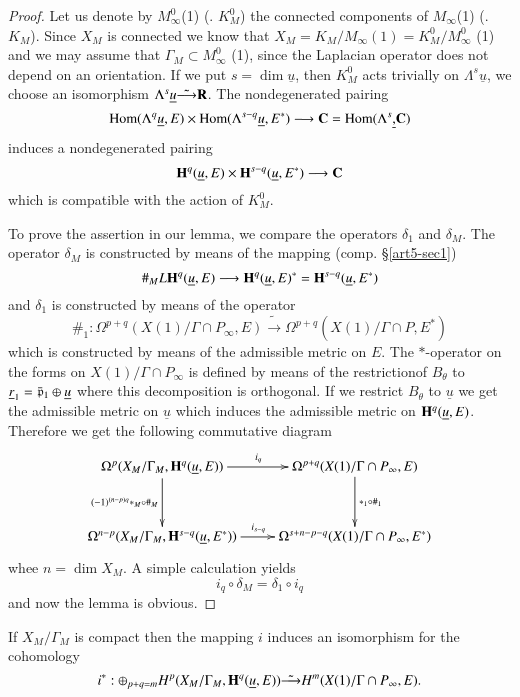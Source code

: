\begin{proof}
Let us denote by $M^0_\infty$(1) (\resp. $K^0_M$) the connected components of $M_\infty$(1) (\resp. $K_M$). Since $X_M$ is connected we know that $X_M = K_M / M_\infty (1) = K^0_M / M^0_\infty$ (1) and we may assume that $\Gamma_M \subset M^0_\infty$ (1), since the Laplacian operator does not depend on an orientation. If we put $s = \dim \underline{u}$, then $K^0_M$ acts trivially on $\Lambda^s \underline{u}$, we choose an isomorphism $\Lambda^s \underline{u} \tilde{\longrightarrow} \mathbf{R}$. The nondegenerated pairing
$$
\operatorname{Hom} (\Lambda^q \underline{u}, E) \times \operatorname{Hom} (\Lambda^{s-q} \underline{u}, E^\ast) \longrightarrow \mathbf{C} = \operatorname{Hom} (\Lambda^s \underline, \mathbf{C})
$$
induces a nondegenerated pairing 
$$
\mathbf{H}^q (\underline{u}, E) \times \mathbf{H}^{s-q}(\underline{u}, E^\ast) \longrightarrow \mathbf{C}
$$
which is compatible with the action of $K^0_M$.

To prove the assertion in our lemma, we compare the operators $\delta_1$ and $\delta_M$. The operator $\delta_M$ is constructed by means of the mapping (comp. \S \ref{art5-sec1})
$$
\#_M L \mathbf{H}^q (\underline{u}, E) \longrightarrow \mathbf{H}^q (\underline{u}, E)^\ast = \mathbf{H}^{s-q} (\underline{u}, E^\ast)
$$
and $\delta_1$ is constructed by means of the operator 
$$
\#_1: \Omega^{p+q} (X(1) / \Gamma \cap P_\infty, E) \tilde{\longrightarrow} \Omega^{p+q} (X (1) / \Gamma \cap P, E^\ast)
$$
which is constructed by means of the admissible metric on $E$. The $\ast$-operator on the forms on $X(1) / \Gamma \cap P_\infty$ is defined by means of the restriction\pageoriginale of $B_\theta$ to $\underline{r}_1 = \bar{\mathfrak{p}}_1 \oplus \underline{u}$ where this decomposition is orthogonal. If we restrict $B_\theta$ to $\underline{u}$ we get the admissible metric on $\underline{u}$ which induces the admissible metric on $\mathbf{H}^q (\underline{u}, E)$. Therefore we get the following commutative diagram
$$
\xymatrix@R=1.2cm{
\Omega^p (X_M / \Gamma_M, \bH^q (\underline{u}, E)) \ar[r]^{i_q} \ar[d]_{(-1)^{(n-p)q} \ast_M \circ \#_M} & \Omega^{p+q} (X(1) / \Gamma \cap P_\infty, E) \ar[d]^{\ast_1 \circ \#_1}\\
\Omega^{n-p} (X_M/ \Gamma_M, \bH^{s-q} (\underline{u}, E^\ast)) \ar[r]^{i_{s-q}} & \Omega^{s+n - p-q} (X (1)/ \Gamma \cap P_{\infty}, E^\ast)
}
$$ 
whee $n = \dim X_M$. A simple calculation yields
$$
i_q \circ \delta_M = \delta_1 \circ i_q
$$
and now the lemma is obvious.
\end{proof}

\begin{theorem}\label{art5-thm2.8}
If $X_M/ \Gamma_M$ is compact then the mapping $i$ induces  an isomorphism for the cohomology
$$
i^\ast: \oplus_{p+q = m} H^p (X_M / \Gamma_M, \mathbf{H}^q (\underline{u}, E)) \tilde{\longrightarrow} H^m (X(1) / \Gamma \cap P_\infty, E).
$$
\end{theorem}

